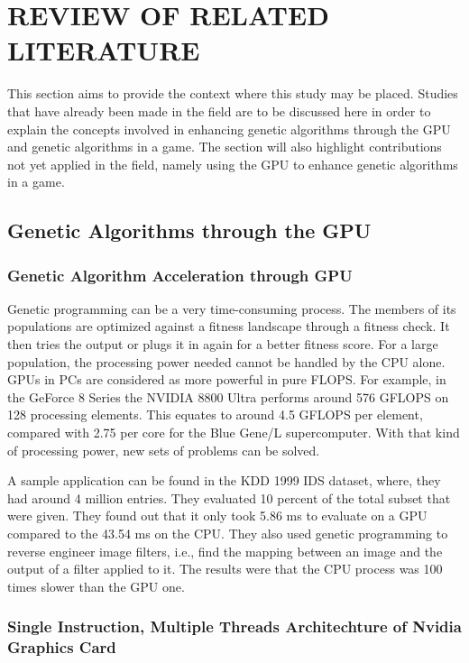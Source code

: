 \chapter{REVIEW OF RELATED LITERATURE}

This section aims to provide the context where this study may be placed. 
Studies that have already been made in the field are to be discussed here in order to 
explain the concepts involved in enhancing genetic algorithms through the GPU and 
genetic algorithms in a game. The section will also highlight contributions not yet 
applied in the field, namely using the GPU to enhance genetic algorithms in a game.


\section{Genetic Algorithms through the GPU}
\subsection{Genetic Algorithm Acceleration through GPU}
Genetic programming can be a very time-consuming process.  The members of its
populations are optimized against a fitness landscape through a fitness check. It
then tries the output or plugs it in again for a better fitness score. For a large
population, the processing power needed cannot be handled by the CPU alone. GPUs in
PCs are considered as more powerful in pure FLOPS\cite{Banzhaf09}.
For example, in the GeForce 8 Series the NVIDIA 8800 Ultra performs around 576 GFLOPS
on 128 processing elements. This equates to around 4.5 GFLOPS per element, compared
with 2.75 per core for the Blue Gene/L supercomputer.  With that kind of processing power, 
new sets of problems can be solved.  

A sample application can be found in the KDD 1999 IDS dataset, where, they had around
4 million entries\cite{Banzhaf09}. They evaluated 10 percent of the total subset
that were given. They found out that it only took 5.86 ms to evaluate on a GPU
compared to the 43.54 ms on the CPU. They also used genetic programming to
reverse engineer image filters, i.e., find the mapping between an image and the
output of a filter applied to it. The results were that the CPU process was 100
times slower than the GPU one. 

\subsection{Single Instruction, Multiple Threads Architechture of Nvidia
Graphics Card}


